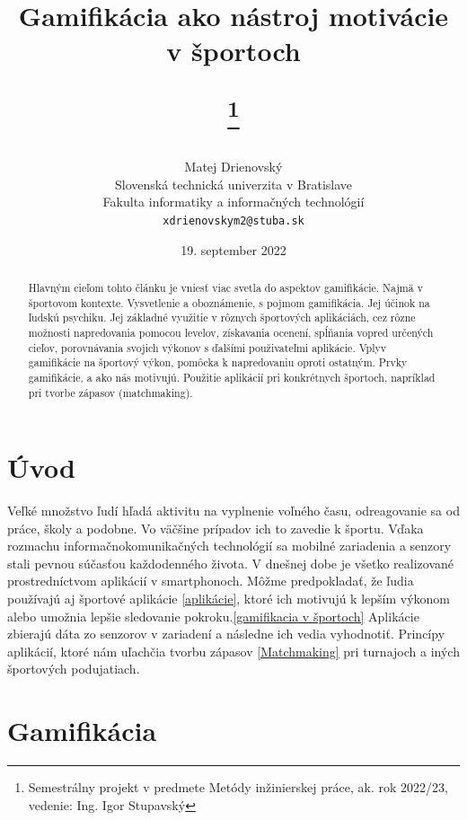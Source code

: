 \documentclass[10pt,twoside,slovak,a4paper]{article}
\title{Gamifikácia ako nástroj motivácie v športoch

\author{Matej Drienovský\\[2pt]
	{\small Slovenská technická univerzita v Bratislave}\\
	{\small Fakulta informatiky a informačných technológií}\\
	{\small \texttt{xdrienovskym2@stuba.sk}}
	}

\date{\small 19. september 2022}
\thanks{Semestrálny projekt v predmete Metódy inžinierskej práce, ak. rok 2022/23, vedenie: Ing. Igor Stupavský}}
\begin{document}
\maketitle

\begin{abstract}

Hlavným cieľom tohto článku je vniesť viac svetla do aspektov
gamifikácie. Najmä
v športovom kontexte. Vysvetlenie a oboznámenie, s pojmom gamifikácia. Jej účinok na
ľudskú psychiku. Jej základné využitie v rôznych športových aplikáciách, cez rôzne možnosti
napredovania pomocou levelov, získavania ocenení, spĺňania vopred určených cieľov,
porovnávania svojich výkonov s ďalšími použivateľmi aplikácie. Vplyv gamifikácie na športový
výkon, pomôcka k napredovaniu oproti ostatným. Prvky gamifikácie, a ako nás motivujú. Použitie aplikácií pri konkrétnych športoch, napríklad pri tvorbe zápasov
(matchmaking).
\end{abstract}


\section{Úvod}
Veľké množstvo ľudí hľadá aktivitu na vyplnenie voľného času, odreagovanie sa od práce, školy a podobne. Vo väčšine prípadov ich to zavedie k športu. 
Vďaka rozmachu informačnokomunikačných technológií sa mobilné zariadenia a senzory stali pevnou súčasťou každodenného života.
V dnešnej dobe je všetko realizované prostredníctvom aplikácií v smartphonoch. 
Môžme predpokladať, že ľudia používajú aj športové aplikácie \ref{aplikácie}, ktoré ich motivujú k lepším výkonom alebo umožnia lepšie sledovanie pokroku.\ref{gamifikacia v športoch} Aplikácie zbierajú dáta zo senzorov v zariadení a následne ich vedia vyhodnotiť.
Princípy aplikácií, ktoré nám uľachčia tvorbu zápasov \ref{Matchmaking} pri turnajoch a iných športových podujatiach.\cite{Effect_of_gamification-Framework}


\newpage
\section{Gamifikácia} \label{gamifikácia}
\end{document}
